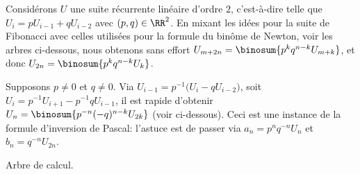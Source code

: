 

\begin{remark}
	Considérons $U$ une suite récurrente linéaire d'ordre $2$,
	c'est-à-dire telle que
	$U_{i} = p U_{i-1} + q U_{i-2}$ avec $(p, q) \in \RR^2$.
	En mixant les idées pour la suite de Fibonacci avec celles utilisées pour la formule du binôme de Newton, voir les arbres ci-dessous, nous obtenons sans effort
	$U_{m+2n} = \binosum{p^k q^{n-k} U_{m+k}}$,
	et donc
	$U_{2n} = \binosum{p^k q^{n-k} U_{k}}$.

    	        {\intertree}{}
	        
	
	Supposons $p \neq 0$ et $q \neq 0$.
	Via  $U_{i-1} = p^{-1} \big( U_{i} - q U_{i-2} \big)$, 
	soit $U_{i} = p^{-1} U_{i+1} - p^{-1} q U_{i-1}$,
	il est rapide d'obtenir
	$U_n = \binosum{p^{-n} (-q)^{n-k} U_{2k}}$ (voir ci-dessous).
	Ceci est une instance de la formule d'inversion de Pascal:
	l'astuce est de passer via
    $a_n = p^n q^{-n} U_{n}$
    et
    $b_n = q^{-n} U_{2n}$.

    \begin{center}
    	\itshape\centering
        
    
        Arbre de calcul.
    \end{center}
\end{remark}
